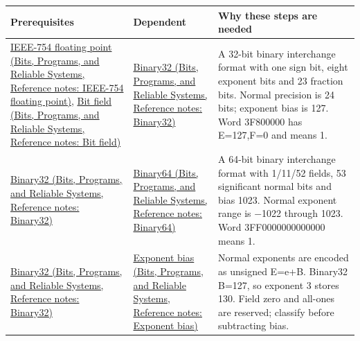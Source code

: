 {\def\LTcaptype{none} %
\begin{longtable}[]{@{}
  >{\raggedright\arraybackslash}p{}
  >{\raggedright\arraybackslash}p{}
  >{\raggedright\arraybackslash}p{}@{}}
\toprule\noalign{}
\begin{minipage}[b]{\linewidth}\raggedright
Prerequisites
\end{minipage} & \begin{minipage}[b]{\linewidth}\raggedright
Dependent
\end{minipage} & \begin{minipage}[b]{\linewidth}\raggedright
Why these steps are needed
\end{minipage} \\
\midrule\noalign{}
\endhead
\bottomrule\noalign{}
\endlastfoot
\href{../01-Bits-Programs-and-Reliable-Systems/main.pdf\#nameddest=appendix-343615f49ddf}{IEEE-754 floating point (Bits, Programs, and Reliable Systems, Reference notes: IEEE-754 floating point)}, \href{../01-Bits-Programs-and-Reliable-Systems/main.pdf\#nameddest=appendix-ac697f5c66e8}{Bit field (Bits, Programs, and Reliable Systems, Reference notes: Bit field)} & \href{../01-Bits-Programs-and-Reliable-Systems/main.pdf\#nameddest=appendix-5057f9ad327f}{Binary32 (Bits, Programs, and Reliable Systems, Reference notes: Binary32)} & A 32-bit binary interchange format with one sign bit, eight exponent bits and 23 fraction bits. Normal precision is 24 bits; exponent bias is 127. Word 3F800000 has E=127,F=0 and means 1. \\
\href{../01-Bits-Programs-and-Reliable-Systems/main.pdf\#nameddest=appendix-5057f9ad327f}{Binary32 (Bits, Programs, and Reliable Systems, Reference notes: Binary32)} & \href{../01-Bits-Programs-and-Reliable-Systems/main.pdf\#nameddest=appendix-5078dfab64e6}{Binary64 (Bits, Programs, and Reliable Systems, Reference notes: Binary64)} & A 64-bit binary interchange format with 1/11/52 fields, 53 significant normal bits and bias 1023. Normal exponent range is −1022 through 1023. Word 3FF0000000000000 means 1. \\
\href{../01-Bits-Programs-and-Reliable-Systems/main.pdf\#nameddest=appendix-5057f9ad327f}{Binary32 (Bits, Programs, and Reliable Systems, Reference notes: Binary32)} & \href{../01-Bits-Programs-and-Reliable-Systems/main.pdf\#nameddest=appendix-2fae058c82e1}{Exponent bias (Bits, Programs, and Reliable Systems, Reference notes: Exponent bias)} & Normal exponents are encoded as unsigned E=e+B. Binary32 B=127, so exponent 3 stores 130. Field zero and all-ones are reserved; classify before subtracting bias. \\

\end{longtable}}
